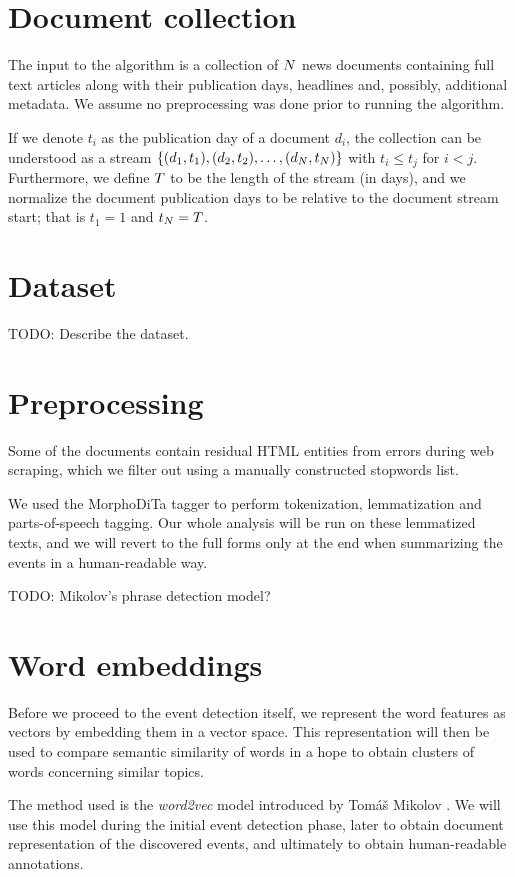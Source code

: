 \section{Document collection}
The input to the algorithm is a collection of $N$ news documents containing full text articles along with their publication days, headlines and, possibly, additional metadata. We assume no preprocessing was done prior to running the algorithm.

If we denote $t_{i}$ as the publication day of a document $d_{i}$, the collection can be understood as a stream $\left\{ (d_{1}, t_{1}), (d_{2}, t_{2}), \dots, (d_{N}, t_{N}) \right\}$ with $t_{i} \leq t_{j}$ for $i < j$. Furthermore, we define $T$ to be the length of the stream (in days), and we normalize the document publication days to be relative to the document stream start; that is $t_{1} = 1$ and $t_{N} = T$.


\section{Dataset}
{\color{red} TODO: Describe the dataset.}


\section{Preprocessing}
Some of the documents contain residual HTML entities from errors during web scraping, which we filter out using a manually constructed stopwords list.

We used the MorphoDiTa tagger \cite{morphodita} to perform tokenization, lemmatization and parts-of-speech tagging. Our whole analysis will be run on these lemmatized texts, and we will revert to the full forms only at the end when summarizing the events in a human-readable way.

{\color{red} TODO: Mikolov's phrase detection model?}


\section{Word embeddings} \label{word-embeddings}
Before we proceed to the event detection itself, we represent the word features as vectors by embedding them in a vector space. This representation will then be used to compare semantic similarity of words in a hope to obtain clusters of words concerning similar topics.

The method used is the \textit{word2vec} model introduced by Tomáš Mikolov \cite{distributed-representations, linguistic-regularities, word2vec}. We will use this model during the initial event detection phase, later to obtain document representation of the discovered events, and ultimately to obtain human-readable annotations.

